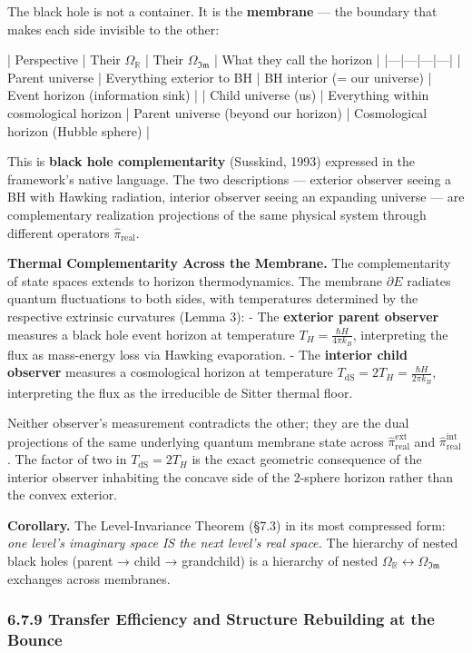\documentclass[11pt,a4paper]{article}
\theoremstyle{definition}
\theoremstyle{remark}
\begin{document}
The black hole is not a container. It is the \textbf{membrane} — the boundary that makes each side invisible to the other:

| Perspective | Their $\Omega_{\mathbb{R}}$ | Their $\Omega_{\mathfrak{Im}}$ | What they call the horizon |
|---|---|---|---|
| Parent universe | Everything exterior to BH | BH interior (= our universe) | Event horizon (information sink) |
| Child universe (us) | Everything within cosmological horizon | Parent universe (beyond our horizon) | Cosmological horizon (Hubble sphere) |

This is \textbf{black hole complementarity} (Susskind, 1993) expressed in the framework's native language. The two descriptions — exterior observer seeing a BH with Hawking radiation, interior observer seeing an expanding universe — are complementary realization projections of the same physical system through different operators $\hat{\pi}_{\text{real}}$.

\textbf{Thermal Complementarity Across the Membrane.} The complementarity of state spaces extends to horizon thermodynamics. The membrane $\partial E$ radiates quantum fluctuations to both sides, with temperatures determined by the respective extrinsic curvatures (Lemma 3):
- The \textbf{exterior parent observer} measures a black hole event horizon at temperature $T_H = \frac{\hbar H}{4\pi k_B}$, interpreting the flux as mass-energy loss via Hawking evaporation.
- The \textbf{interior child observer} measures a cosmological horizon at temperature $T_{\text{dS}} = 2 T_H = \frac{\hbar H}{2\pi k_B}$, interpreting the flux as the irreducible de Sitter thermal floor.

Neither observer's measurement contradicts the other; they are the dual projections of the same underlying quantum membrane state across $\hat{\pi}_{\text{real}}^{\text{ext}}$ and $\hat{\pi}_{\text{real}}^{\text{int}}$. The factor of two in $T_{\text{dS}} = 2T_H$ is the exact geometric consequence of the interior observer inhabiting the concave side of the 2-sphere horizon rather than the convex exterior.

\textbf{Corollary.} The Level-Invariance Theorem (\S 7.3) in its most compressed form: \textit{one level's imaginary space IS the next level's real space.} The hierarchy of nested black holes (parent → child → grandchild) is a hierarchy of nested $\Omega_{\mathbb{R}} \leftrightarrow \Omega_{\mathfrak{Im}}$ exchanges across membranes.

\subsubsection{6.7.9 Transfer Efficiency and Structure Rebuilding at the Bounce}
\end{document}
